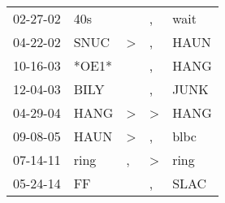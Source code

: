 \begin{supertabular}{p{0.07\textwidth}p{0.06\textwidth}p{0.02\textwidth}p{0.02\textwidth}p{0.06\textwidth}}
 02-27-02\textsuperscript{} &   40s\textsuperscript{} &               &             , &  wait\textsuperscript{} \\
 04-22-02\textsuperscript{} &  SNUC\textsuperscript{} &  \textgreater &             , &  HAUN\textsuperscript{} \\
 10-16-03\textsuperscript{} &                   *OE1* &               &             , &  HANG\textsuperscript{} \\
 12-04-03\textsuperscript{} &  BILY\textsuperscript{} &               &             , &  JUNK\textsuperscript{} \\
 04-29-04\textsuperscript{} &  HANG\textsuperscript{} &  \textgreater &  \textgreater &  HANG\textsuperscript{} \\
 09-08-05\textsuperscript{} &  HAUN\textsuperscript{} &  \textgreater &             , &  blbc\textsuperscript{} \\
 07-14-11\textsuperscript{} &  ring\textsuperscript{} &             , &  \textgreater &  ring\textsuperscript{} \\
 05-24-14\textsuperscript{} &    FF\textsuperscript{} &               &             , &  SLAC\textsuperscript{} \\
\end{supertabular}
